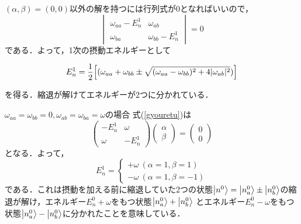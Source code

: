 \documentclass{report}
\begin{document}
  $(\alpha,\beta)=(0,0)$以外の解を持つには行列式が0となればいいので，
  \begin{equation}
    \begin{vmatrix}
      \omega_{aa}-E_n^1&\omega_{ab}\\
      \omega_{ba}&\omega_{bb}-E_n^1
    \end{vmatrix}
    =0
  \end{equation}
  である．よって，1次の摂動エネルギーとして
  \begin{screen}
  \begin{equation}
    \label{syukutai}
    E_n^1=\frac{1}{2}\qty[(\omega_{aa}+\omega_{bb}\pm\sqrt{(\omega_{aa}-\omega_{bb})^2+4|\omega_{ab}|^2})]
  \end{equation}
  \end{screen}
  を得る．縮退が解けてエネルギーが2つに分かれている．
  \begin{myex}{}{}$\omega_{aa}=\omega_{bb}=0,\omega_{ab}=\omega_{ba}=\omega$の場合
  式(\ref{gyouretu})は
  \begin{equation}
    \begin{pmatrix}
      -E_n^1&\omega\\
      \omega&-E_n^1
    \end{pmatrix}
    \begin{pmatrix}
      \alpha\\
      \beta
    \end{pmatrix}
    =\begin{pmatrix}
      0\\0
    \end{pmatrix}
  \end{equation}
  となる．よって，
  \begin{equation}
    E_n^1=
    \begin{cases}
      +\omega\ (\alpha=1,\beta=1)\\
      -\omega\ (\alpha=1,\beta=-1)
    \end{cases}
  \end{equation}
  である．これは摂動を加える前に縮退していた2つの状態$\ket{n^0}=\ket{n_a^0}\pm\ket{n_b^0}$の縮退が解け，エネルギー$E_n^0+\omega$をもつ状態$\ket{n_a^0}+\ket{n_b^0}$
  とエネルギー$E_n^0-\omega$をもつ状態$\ket{n_a^0}-\ket{n_b^0}$に分かれたことを意味している．
  \end{myex}
\end{document}
